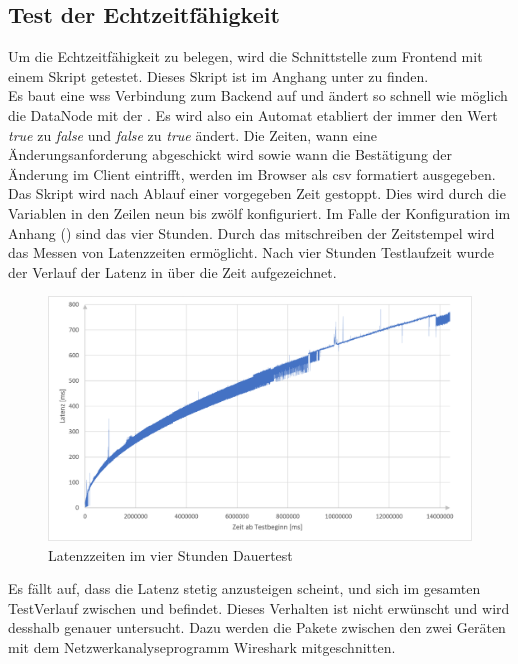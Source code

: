 \subsection{Test der Echtzeitfähigkeit}
Um die Echtzeitfähigkeit zu belegen, wird die Schnittstelle zum Frontend mit einem Skript getestet.
Dieses Skript ist im Anghang unter  zu finden. 
\\Es baut eine \ac{wss} Verbindung zum Backend auf und ändert so schnell wie möglich die DataNode mit der .
Es wird also ein Automat etabliert der immer den Wert \emph{true} zu \emph{false} und \emph{false} zu \emph{true} ändert.
Die Zeiten, wann eine Änderungsanforderung abgeschickt wird sowie wann die Bestätigung der Änderung im Client eintrifft, 
werden im Browser als \ac{csv} formatiert ausgegeben. Das Skript wird nach Ablauf einer vorgegeben Zeit gestoppt. 
Dies wird durch die Variablen in den Zeilen neun bis zwölf konfiguriert. 
Im Falle der Konfiguration im Anhang () sind das vier Stunden.
Durch das mitschreiben der Zeitstempel wird das Messen von Latenzzeiten ermöglicht.
Nach vier Stunden Testlaufzeit wurde der Verlauf der Latenz in  über die Zeit aufgezeichnet.
\begin{figure}[ht]
  \centering
  \includegraphics[width=\textwidth]{content/hauptteil/umsetzungPoC/pocTest/res/LatenzNormal4h.pdf}
  \caption{Latenzzeiten im vier Stunden Dauertest}
  \label{fig:testing:latency4hNorm}
\end{figure}
Es fällt auf, dass die Latenz stetig anzusteigen scheint, und sich im gesamten TestVerlauf zwischen  und  befindet.
Dieses Verhalten ist nicht erwünscht und wird desshalb genauer untersucht.
Dazu werden die Pakete zwischen den zwei Geräten mit dem Netzwerkanalyseprogramm Wireshark \citep{wireshark:program} mitgeschnitten.
